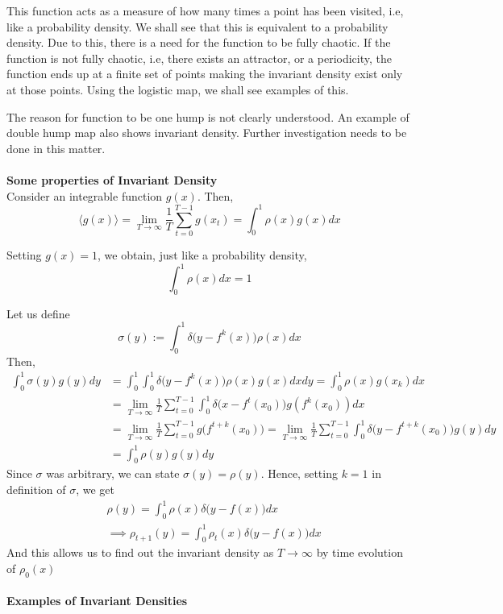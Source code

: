 \documentclass[11pt]{article}
\begin{document}
   			This function acts as a measure of how many times a point has been visited, i.e, like a probability density. We shall see that this is equivalent to a probability density. Due to this, there is a need for the function to be fully chaotic. If the function is not fully chaotic, i.e, there exists an attractor, or a periodicity, the function ends up at a finite set of points making the invariant density exist only at those points. Using the logistic map, we shall see examples of this.

   			The reason for function to be one hump is not clearly understood. An example of double hump map also shows invariant density. Further investigation needs to be done in this matter. \\ \\
   			\textbf{Some properties of Invariant Density}\\

   			Consider an integrable function $g(x)$. Then,
   			$$
   				\langle g(x) \rangle = \lim_{T\to\infty} \frac{1}{T} \sum_{t=0}^{T-1} g(x_t) = \int_0^1\rho(x)g(x)dx
   			$$

   			Setting $g(x) = 1$, we obtain, just like a probability density,
   			$$
   				\int_0^1\rho(x)dx = 1
   			$$

   			Let us define 
   			$$
   				\sigma (y) := \int_0^1\delta\big(y - f^k(x)\big) \rho(x)dx
   			$$
   			Then,
   			\begin{align*}
   				\int_0^1 \sigma(y) g(y) dy &= \int_0^1 \int_0^1 \delta \big(y - f^k(x)\big)\rho(x)g(x)dxdy = \int_0^1 \rho(x)g(x_k)dx \\ 
   				&= \lim_{T\to\infty} \frac{1}{T} \sum_{t=0}^{T-1} \int_0^1 \delta \big( x-f^t(x_0) \big) g(f^k(x_0))dx\\
   				& = \lim_{T\to\infty} \frac{1}{T} \sum_{t=0}^{T-1} g\big(f^{t+k}(x_0)) = \lim_{T\to\infty} \frac{1}{T} \sum_{t=0}^{T-1} \int_0^1 \delta \big(y-f^{t+k}(x_0)\big)g(y)dy \\
   				& = \int_0^1 \rho(y) g(y) dy
   			\end{align*}
   			Since $\sigma$ was arbitrary, we can state $\sigma(y) = \rho (y)$. Hence, setting $k=1$ in definition of $\sigma$, we get
   			\begin{align*}
   				&\rho (y) = \int_0^1 \rho(x) \delta \big(y-f(x)\big)dx \\
   				& \implies \rho_{t+1}(y) = \int_0^1 \rho_t(x) \delta \big(y-f(x)\big)dx 
   			\end{align*}
   			And this allows us to find out the invariant density as $T\to\infty$ by time evolution of $\rho_0(x)$\\ \\
            \newpage
   			\textbf{Examples of Invariant Densities}\\
\end{document}
